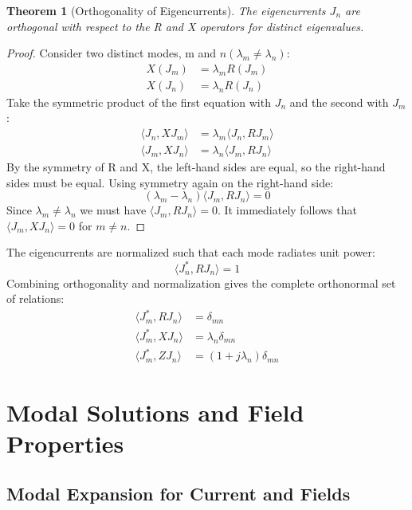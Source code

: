 \documentclass[11pt,a4paper]{article}
\newtheorem{theorem}{Theorem}[section]
\begin{document}
\begin{theorem}[Orthogonality of Eigencurrents]
The eigencurrents \(J_{n}\) are orthogonal with respect to the R and X operators for distinct eigenvalues.
\end{theorem}
\begin{proof}
Consider two distinct modes, m and \(n (\lambda_{m}\ne\lambda_{n})\):
\begin{align}
    X(J_{m}) &= \lambda_{m}R(J_{m}) \\
    X(J_{n}) &= \lambda_{n}R(J_{n})
\end{align}
Take the symmetric product of the first equation with \(J_{n}\) and the second with \(J_{m}\):
\begin{align}
    \langle J_{n},XJ_{m}\rangle &= \lambda_{m}\langle J_{n},RJ_{m}\rangle \\
    \langle J_{m},XJ_{n}\rangle &= \lambda_{n}\langle J_{m},RJ_{n}\rangle
\end{align}
By the symmetry of R and X, the left-hand sides are equal, so the right-hand sides must be equal. Using symmetry again on the right-hand side:
\begin{equation}
    (\lambda_{m}-\lambda_{n})\langle J_{m},RJ_{n}\rangle=0
\end{equation}
Since \(\lambda_{m}\ne\lambda_{n}\) we must have \(\langle J_{m},RJ_{n}\rangle=0\). It immediately follows that \(\langle J_{m},XJ_{n}\rangle=0\) for \(m\ne n\).
\end{proof}

The eigencurrents are normalized such that each mode radiates unit power:
\begin{equation}
    \langle J_{n}^{*},RJ_{n}\rangle=1
\end{equation}
Combining orthogonality and normalization gives the complete orthonormal set of relations:
\begin{align}
    \langle J_{m}^{*},RJ_{n}\rangle &= \delta_{mn} \\
    \langle J_{m}^{*},XJ_{n}\rangle &= \lambda_{n}\delta_{mn} \\
    \langle J_{m}^{*},ZJ_{n}\rangle &= (1+j\lambda_{n})\delta_{mn}
\end{align}

\section{Modal Solutions and Field Properties}
\subsection{Modal Expansion for Current and Fields}
\end{document}
